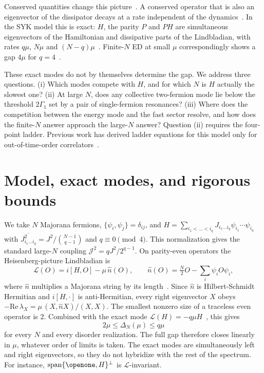 \documentclass[aps,pre,twocolumn,superscriptaddress,amsmath,amssymb,10pt]{revtex4-2}
\newcommand{\Lc}{\mathcal{L}}
\newcommand{\J}{\mathcal{J}}
\begin{document}
Conserved quantities change this picture~\cite{Mori2024,Yang2025}. A conserved operator that is also an eigenvector of the dissipator decays at a rate independent of the dynamics~\cite{Teretenkov2024}. In the SYK model this is exact: $H$, the parity $P$ and $PH$ are simultaneous eigenvectors of the Hamiltonian and dissipative parts of the Lindbladian, with rates $q\mu$, $N\mu$ and $(N-q)\mu$~\cite{Garcia2026}. Finite-$N$ ED at small $\mu$ correspondingly shows a gap $4\mu$ for $q=4$~\cite{Garcia2023}.

These exact modes do not by themselves determine the gap. We address three questions. (i) Which modes compete with $H$, and for which $N$ is $H$ actually the slowest one? (ii) At large $N$, does any collective two-fermion mode lie below the threshold $2\Gamma_1$ set by a pair of single-fermion resonances? (iii) Where does the competition between the energy mode and the fast sector resolve, and how does the finite-$N$ answer approach the large-$N$ answer? Question (ii) requires the four-point ladder. Previous work has derived ladder equations for this model only for out-of-time-order correlators~\cite{Garcia2024}.

\section{Model, exact modes, and rigorous bounds}

We take $N$ Majorana fermions, $\{\psi_i,\psi_j\}=\delta_{ij}$, and $H=\sum_{i_1<\dots<i_q}J_{i_1\dots i_q}\psi_{i_1}\cdots\psi_{i_q}$ with $\overline{J^2_{i_1\dots i_q}}=J^2/\binom{N-1}{q-1}$ and $q\equiv0 \pmod 4$. This normalization gives the standard large-$N$ coupling $\J^2=qJ^2/2^{q-1}$. On parity-even operators the Heisenberg-picture Lindbladian is
\begin{equation}
\Lc(O)=i[H,O]-\mu\,\hat n(O),\qquad \hat n(O)=\tfrac N2O-\sum_i\psi_iO\psi_i,
\label{eq:L}
\end{equation}
where $\hat n$ multiplies a Majorana string by its length~\cite{Schuster2023,Bhattacharjee2023,Liu2024}. Since $\hat n$ is Hilbert-Schmidt Hermitian and $i[H,\cdot]$ is anti-Hermitian, every right eigenvector $X$ obeys $-\mathrm{Re}\,\lambda_X=\mu\,(X,\hat nX)/(X,X)$. The smallest nonzero size of a traceless even operator is $2$. Combined with the exact mode $\Lc(H)=-q\mu H$~\cite{Garcia2026}, this gives
\begin{equation}
2\mu\le\Delta_N(\mu)\le q\mu
\label{eq:bound}
\end{equation}
for every $N$ and every disorder realization. The full gap therefore closes linearly in $\mu$, whatever order of limits is taken. The exact modes are simultaneously left and right eigenvectors, so they do not hybridize with the rest of the spectrum. For instance, $\mathrm{span}\{\openone,H\}^\perp$ is $\Lc$-invariant.
\end{document}
